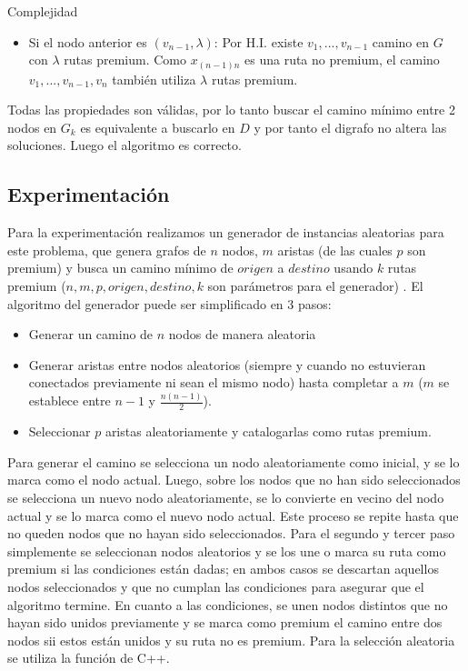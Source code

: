 \begin{subsection}{Complejidad}
\begin{itemize}
\item Si el nodo anterior es $(v_{n-1}, \lambda)$: Por H.I. existe $v_1, ..., v_{n-1}$ camino en $G$ con $\lambda$ rutas premium. Como $x_{(n-1)n}$ es una ruta no premium, el camino $v_1, ..., v_{n-1}, v_n$ también utiliza $\lambda$ rutas premium.

\end{itemize}

Todas las propiedades son válidas, por lo tanto buscar el camino mínimo entre 2 nodos en $G_k$ es equivalente a buscarlo en $D$ y por tanto el digrafo no altera las soluciones. Luego el algoritmo es correcto. 

\subsection{Experimentaci\'{o}n}

Para la experimentaci\'{o}n realizamos un generador de instancias aleatorias para este problema, que genera grafos de $n$ nodos, $m$ aristas (de las cuales $p$ son premium) y busca un camino m\'{i}nimo de $origen$ a $destino$ usando $k$ rutas premium ($n, m, p, origen, destino, k$ son par\'{a}metros para el generador) . El algoritmo del generador puede ser simplificado en 3 pasos:
\begin{itemize}
    \item Generar un camino de $n$ nodos de manera aleatoria
    \item Generar aristas entre nodos aleatorios (siempre y cuando no estuvieran conectados previamente ni sean el mismo nodo) hasta completar a $m$ ($m$ se establece entre $n-1$ y $\frac{n(n-1)}{2}$).
    \item Seleccionar $p$ aristas aleatoriamente y catalogarlas como rutas premium.
\end{itemize}

Para generar el camino se selecciona un nodo aleatoriamente como inicial, y se lo marca como el nodo actual. Luego, sobre los nodos que no han sido seleccionados se selecciona un nuevo nodo aleatoriamente, se lo convierte en vecino del nodo actual y se lo marca como el nuevo nodo actual. Este proceso se repite hasta que no queden nodos que no hayan sido seleccionados. Para el segundo y tercer paso simplemente se seleccionan nodos aleatorios y se los une o marca su ruta como premium si las condiciones están dadas; en ambos casos se descartan aquellos nodos seleccionados y que no cumplan las condiciones para asegurar que el algoritmo termine. En cuanto a las condiciones, se unen nodos distintos que no hayan sido unidos previamente y se marca como premium el camino entre dos nodos sii estos están unidos y su ruta no es premium.
Para la selecci\'{o}n aleatoria se utiliza la funci\'{o}n  de C++.


\end{subsection}
